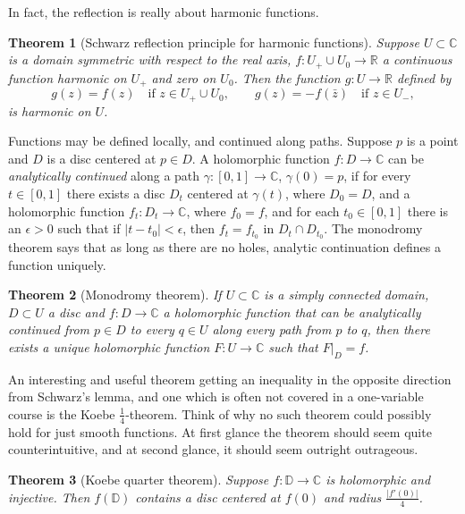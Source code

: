 \documentclass[12pt,openany]{book}
\newcommand{\sabs}[1]{\lvert {#1} \rvert}
\newcommand{\C}{{\mathbb{C}}}
\newcommand{\R}{{\mathbb{R}}}
\newcommand{\D}{{\mathbb{D}}}
\theoremstyle{plain}
\newtheorem{thm}{Theorem}[section]
\theoremstyle{remark}
\theoremstyle{definition}
\theoremstyle{exercise}
\theoremstyle{example}
\begin{document}
In fact, the reflection is really about harmonic functions.

\begin{thm}[Schwarz reflection principle for harmonic functions]
Suppose $U \subset \C$ is a domain symmetric with respect to the real axis,
$f \colon U_+ \cup U_0 \to \R$ a continuous function harmonic on $U_+$
and zero on $U_0$.  Then the function $g \colon U \to \R$
defined by
\begin{equation*}
g(z) = f(z) \quad \text{if $z \in U_+ \cup U_0$},
\qquad
g(z) =
-f(\bar{z}) \quad \text{if $z \in U_-$},
\end{equation*}
is harmonic on $U$.
\end{thm}

Functions may be defined locally, and continued along paths.
Suppose $p$ is a point and $D$ is a disc centered at $p \in D$.
A holomorphic function $f \colon D \to \C$ can be
\emph{analytically continued}
along a path
$\gamma \colon [0,1] \to \C$, $\gamma(0) = p$,
if for every $t \in [0,1]$ there exists
a disc $D_t$ centered at $\gamma(t)$, where $D_0=D$, and a holomorphic function
$f_t \colon D_t \to \C$, where $f_0 = f$, and for each $t_0 \in [0,1]$ there is an
$\epsilon > 0$ such that if $\sabs{t-t_0} < \epsilon$, then
$f_t = f_{t_0}$
in $D_t \cap D_{t_0}$.  The monodromy theorem says that as long as there are
no holes, analytic continuation defines a function uniquely.

\begin{thm}[Monodromy theorem]
If $U \subset \C$ is a simply connected domain, $D \subset U$ a disc and
$f \colon D \to \C$ a holomorphic function that can be analytically
continued from $p \in D$ to every $q \in U$ along every path from $p$ to $q$, then there exists
a unique holomorphic function $F \colon U \to \C$ such that $F|_D = f$.
\end{thm}

\medskip

An interesting and useful theorem getting an inequality in the opposite
direction from
Schwarz's lemma, and one which is often not covered in a one-variable
course is the Koebe $\frac{1}{4}$-theorem.
Think of why no such theorem could possibly hold for just smooth
functions.  At first glance the theorem should seem quite counterintuitive,
and at second glance, it should seem outright outrageous.

\begin{thm}[Koebe quarter theorem]
Suppose $f \colon \D \to \C$ is holomorphic and injective.  Then
$f(\D)$ contains a disc centered at $f(0)$ and radius $\frac{\sabs{f'(0)}}{4}$.
\end{thm}
\end{document}
